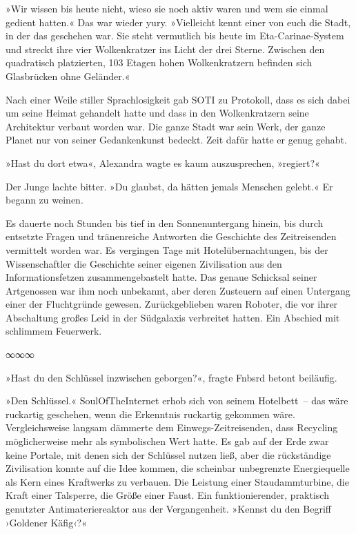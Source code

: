 »Wir wissen bis heute nicht, wieso sie noch aktiv waren und wem sie einmal gedient hatten.« Das war wieder yury. »Vielleicht kennt einer von euch die Stadt, in der das geschehen war. Sie steht vermutlich bis heute im Eta-Carinae-System und streckt ihre vier Wolkenkratzer ins Licht der drei Sterne. Zwischen den quadratisch platzierten, 103 Etagen hohen Wolkenkratzern befinden sich Glasbrücken ohne Geländer.«

Nach einer Weile stiller Sprachlosigkeit gab SOTI zu Protokoll, dass es sich dabei um seine Heimat gehandelt hatte und dass in den Wolkenkratzern seine Architektur verbaut worden war. Die ganze Stadt war sein Werk, der ganze Planet nur von seiner Gedankenkunst bedeckt. Zeit dafür hatte er genug gehabt.

»Hast du dort etwa«, Alexandra wagte es kaum auszusprechen, »regiert?«

Der Junge lachte bitter. »Du glaubst, da hätten jemals Menschen gelebt.« Er begann zu weinen.

Es dauerte noch Stunden bis tief in den Sonnenuntergang hinein, bis durch entsetzte Fragen und tränenreiche Antworten die Geschichte des Zeitreisenden vermittelt worden war. Es vergingen Tage mit Hotelübernachtungen, bis der Wissenschaftler die Geschichte seiner eigenen Zivilisation aus den Informationsfetzen zusammengebastelt hatte. Das genaue Schicksal seiner Artgenossen war ihm noch unbekannt, aber deren Zusteuern auf einen Untergang einer der Fluchtgründe gewesen. Zurückgeblieben waren Roboter, die vor ihrer Abschaltung großes Leid in der Südgalaxis verbreitet hatten. Ein Abschied mit schlimmem Feuerwerk.

\begin{center}
∞∞∞
\end{center}

»Hast du den Schlüssel inzwischen geborgen?«, fragte Fnbsrd betont beiläufig.

»Den Schlüssel.« SoulOfTheInternet erhob sich von seinem Hotelbett~– das wäre ruckartig geschehen, wenn die Erkenntnis ruckartig gekommen wäre. Vergleichsweise langsam dämmerte dem Einwegs-Zeitreisenden, dass Recycling möglicherweise mehr als symbolischen Wert hatte. Es gab auf der Erde zwar keine Portale, mit denen sich der Schlüssel nutzen ließ, aber die rückständige Zivilisation konnte auf die Idee kommen, die scheinbar unbegrenzte Energiequelle als Kern eines Kraftwerks zu verbauen. Die Leistung einer Staudammturbine, die Kraft einer Talsperre, die Größe einer Faust. Ein funktionierender, praktisch genutzter Antimateriereaktor aus der Vergangenheit. »Kennst du den Begriff ›Goldener Käfig‹?«

